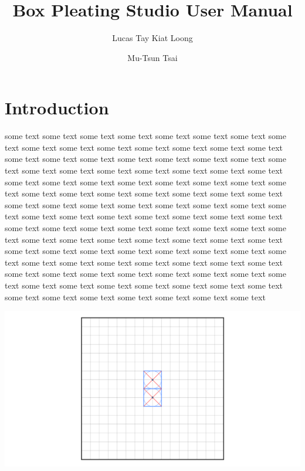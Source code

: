 \documentclass[10pt,twoside]{article}
\title{Box Pleating Studio User Manual}
\author{
	Lucas Tay Kiat Loong
	\and
	Mu-Tsun Tsai
}
\begin{document}
\maketitle

\section{Introduction}\label{sec:introduction}

some text some text some text some text some text some text some text
some text some text some text some text some text some text some text
some text some text some text some text some text some text some text
some text some text some text some text some text some text some text
some text some text some text some text some text some text some text
some text some text some text some text some text some text some text
some text some text some text some text some text some text some text
some text some text some text some text some text some text some text
some text some text some text some text some text some text some text
some text some text some text some text some text some text some text
some text some text some text some text some text some text some text
some text some text some text some text some text some text some text
some text some text some text some text some text some text some text
some text some text some text some text some text some text some text
some text some text some text some text some text some text some text
some text some text some text some text some text some text some text

\includegraphics[width=\textwidth]{figures/1.png}
\end{document}
